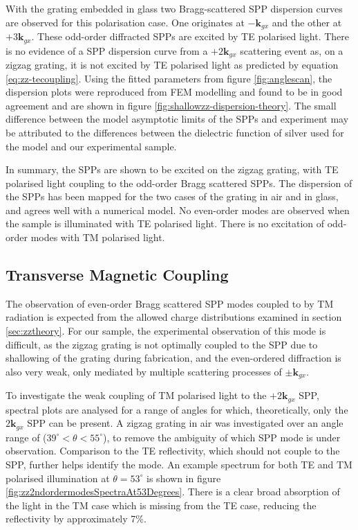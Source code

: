 With the grating embedded in glass two Bragg-scattered SPP dispersion curves are observed for this polarisation case. One originates at $-\mathbf{k}_{gx}$ and the other at $+3\mathbf{k}_{gx}$. These odd-order diffracted SPPs are excited by TE polarised light. There is no evidence of a SPP dispersion curve from a $+2\mathbf{k}_{gx}$ scattering event as, on a zigzag grating, it is not excited by TE polarised light as predicted by equation \ref{eq:zz-tecoupling}. Using the fitted parameters from figure \ref{fig:anglescan}, the dispersion plots were reproduced from FEM modelling and found to be in good agreement and are shown in figure \ref{fig:shallowzz-dispersion-theory}. The small difference between the model asymptotic limits of the SPPs and experiment may be attributed to the differences between the dielectric function of silver used for the model \cite{Nash1996} and our experimental sample. 

In summary, the SPPs are shown to be excited on the zigzag grating, with TE polarised light coupling to the odd-order Bragg scattered SPPs. The dispersion of the SPPs has been mapped for the two cases of the grating in air and in glass, and agrees well with a numerical model. No even-order modes are observed when the sample is illuminated with TE polarised light. There is no excitation of odd-order modes with TM polarised light.

\subsection{Transverse Magnetic Coupling\label{sec:TMexciatation}}

The observation of even-order Bragg scattered SPP modes coupled to by TM radiation is expected from the allowed charge distributions examined in section \ref{sec:zztheory}. For our sample, the experimental observation of this mode is difficult, as the zigzag grating is not optimally coupled to the SPP due to shallowing of the grating during fabrication, and the even-ordered diffraction is also very weak, only mediated by multiple scattering processes of $\pm \mathbf{k}_{gx}$.

To investigate the weak coupling of TM polarised light to the $+2\mathbf{k}_{gx}$ SPP, spectral plots are analysed for a range of angles for which, theoretically, only the  $2\mathbf{k}_{gx}$ SPP can be present. A zigzag grating in air was investigated over an angle range of ($39^\circ<\theta<55^\circ$), to remove the ambiguity of which SPP mode is under observation. Comparison to the TE reflectivity, which should not couple to the SPP, further helps identify the mode. An example spectrum for both TE and TM polarised illumination at $\theta=53^\circ$ is shown in figure \ref{fig:zz2ndordermodesSpectraAt53Degrees}. There is a clear broad absorption of the light in the TM case which is missing from the TE case, reducing the reflectivity by approximately 7\%. 

